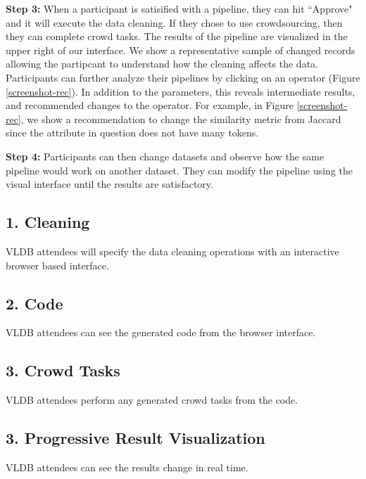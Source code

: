 \vspace{0.5em}

\noindent\textbf{Step 3: } When a participant is satisified with a pipeline, they can hit ``Approve" and it will execute the data cleaning. If they chose to use crowdsourcing, then they can complete crowd tasks. The results of the pipeline are visualized in the upper right of our interface.
We show a representative sample of changed records allowing the partipcant to understand how the cleaning affects the data. 
Participants can further analyze their pipelines by clicking on an operator (Figure \ref{screenshot-rec}).
In addition to the parameters, this reveals intermediate results, and recommended changes to the operator.
For example, in Figure \ref{screenshot-rec}, we show a recommendation to change the similarity metric from Jaccard since the attribute in question does not have many tokens.

\vspace{0.5em}

\noindent\textbf{Step 4: } Participants can then change datasets and observe how the same pipeline would work on another dataset.
They can modify the pipeline using the visual interface until the results are satisfactory.

\subsection{1. Cleaning}
VLDB attendees will specify the data cleaning operations with an interactive browser based
interface. 

\subsection{2. Code}
VLDB attendees can see the generated code from the browser interface.

\subsection{3. Crowd Tasks}
VLDB attendees perform any generated crowd tasks from the code.  

\subsection{3. Progressive Result Visualization}
VLDB attendees can see the results change in real time.  
\fi
